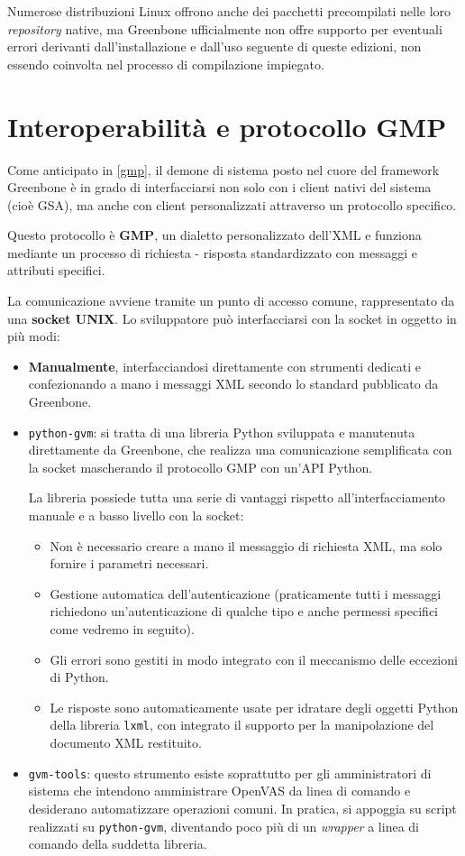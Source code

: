 Numerose distribuzioni Linux offrono anche dei pacchetti precompilati nelle loro \emph{repository} native, ma Greenbone ufficialmente non offre supporto per eventuali errori derivanti dall'installazione e dall'uso seguente di queste edizioni, non essendo coinvolta nel processo di compilazione impiegato.

\section{Interoperabilità e protocollo GMP}
Come anticipato in \ref{gmp}, il demone di sistema posto nel cuore del framework Greenbone è in grado di interfacciarsi non solo con i client nativi del sistema (cioè GSA), ma anche con client personalizzati attraverso un protocollo specifico.

Questo protocollo è \textbf{GMP}, un dialetto personalizzato dell'XML e funziona mediante un processo di richiesta - risposta standardizzato con messaggi e attributi specifici.

La comunicazione avviene tramite un punto di accesso comune, rappresentato da una \textbf{socket UNIX}. Lo sviluppatore può interfacciarsi con la socket in oggetto in più modi:
\begin{itemize}
    \item \textbf{Manualmente}, interfacciandosi direttamente con strumenti dedicati e confezionando a mano i messaggi XML secondo lo standard pubblicato da Greenbone.
    \item \texttt{python-gvm}: si tratta di una libreria Python sviluppata e manutenuta direttamente da Greenbone, che realizza una comunicazione semplificata con la socket mascherando il protocollo GMP con un'API Python.
    
    La libreria possiede tutta una serie di vantaggi rispetto all'interfacciamento manuale e a basso livello con la socket:
    \begin{itemize}
        \item Non è necessario creare a mano il messaggio di richiesta XML, ma solo fornire i parametri necessari.
        \item Gestione automatica dell'autenticazione (praticamente tutti i messaggi richiedono un'autenticazione di qualche tipo e anche permessi specifici come vedremo in seguito).
        \item Gli errori sono gestiti in modo integrato con il meccanismo delle eccezioni di Python.
        \item Le risposte sono automaticamente usate per idratare degli oggetti Python della libreria \texttt{lxml}, con integrato il supporto per la manipolazione del documento XML restituito.
    \end{itemize}
    \item \texttt{gvm-tools}: questo strumento esiste soprattutto per gli amministratori di sistema che intendono amministrare OpenVAS da linea di comando e desiderano automatizzare operazioni comuni. In pratica, si appoggia su script realizzati su \texttt{python-gvm}, diventando poco più di un \emph{wrapper} a linea di comando della suddetta libreria.
\end{itemize}

